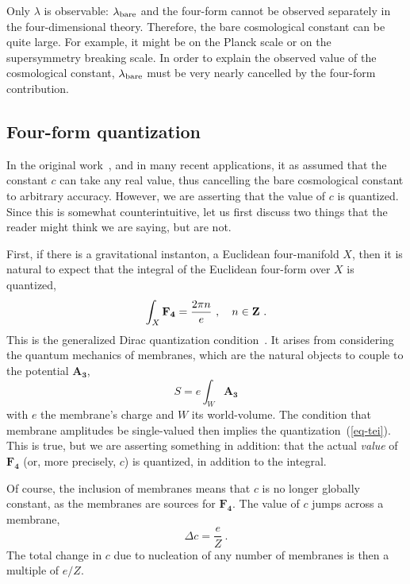 \documentclass[12pt]{article}
\begin{document}
Only $\lambda$ is observable: $\lambda_{\rm bare}$ and the four-form
cannot be observed separately in the four-dimensional theory.
Therefore, the bare cosmological constant can be quite large.  For
example, it might be on the Planck scale or on the supersymmetry
breaking scale.  In order to explain the observed value of the
cosmological constant, $\lambda_{\rm bare}$ must be very nearly
cancelled by the four-form contribution.

\subsection{Four-form quantization}

In the original work~\cite{Haw84b}, and in many recent applications,
it as assumed that the constant $c$ can take any real value, thus
cancelling the bare cosmological constant to arbitrary accuracy.
However, we are asserting that the value of $c$ is quantized.  Since
this is somewhat counterintuitive, let us first discuss two things
that the reader might think we are saying, but are not.

First, if there is a gravitational instanton, a Euclidean
four-manifold $X$, then it is natural to expect that the integral of
the Euclidean four-form over $X$ is quantized,
\begin{equation}
\int_X \mathbf{F_{4}} = \frac{2\pi n}{e}\ ,
\quad n \in {\bf Z} \ . \label{eq-tei}
\end{equation}
This is the generalized Dirac quantization
condition~\cite{Sav77,Orl82,Nep85,Tei86}.  It arises from considering
the quantum mechanics of membranes, which are the natural objects to
couple to the potential $\mathbf{A_{3}}$,
\begin{equation}
S = e \int_W \mathbf{A_{3}}
\end{equation}
with $e$ the membrane's charge and $W$ its world-volume.  The
condition that membrane amplitudes be single-valued then implies the
quantization~(\ref{eq-tei}).  This is true, but we are asserting
something in addition: that the actual {\em value} of $\mathbf{F_{4}}$
(or, more precisely, $c$) is quantized, in addition to the integral.

Of course, the inclusion of membranes means that $c$ is no longer
globally constant, as the membranes are sources for $\mathbf{F_4}$.
The value of $c$ jumps across a membrane,
\begin{equation}
\Delta c = \frac{e}{Z} \ .
\end{equation}
The total change in $c$ due to nucleation of any number of membranes
is then a multiple of $e/Z$.
\end{document}
